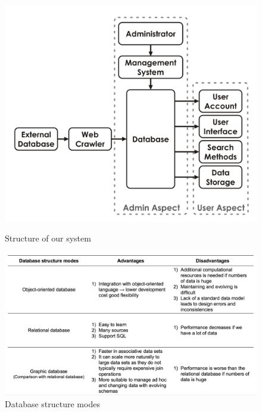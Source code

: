 \begin{figure}[h]
	\begin{center}
		\includegraphics[scale=0.4]{WolverineChart}
	\end{center}
	\caption{Structure of our system}
	\begin{center}
		\includegraphics[scale=0.3]{WolverineChart2}
	\end{center}
	\caption{Database structure modes}
\end{figure}
\clearpage
